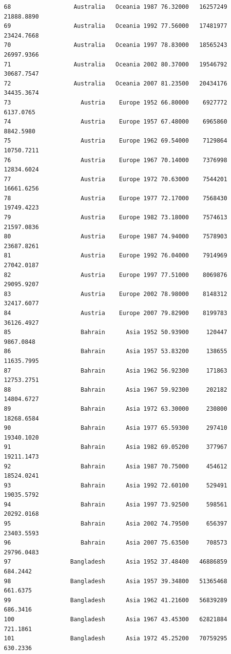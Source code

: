 \documentclass[
  letterpaper,
  DIV=11,
  numbers=noendperiod]{scrreprt}
\begin{document}
\begin{verbatim}
68                  Australia   Oceania 1987 76.32000   16257249  21888.8890
69                  Australia   Oceania 1992 77.56000   17481977  23424.7668
70                  Australia   Oceania 1997 78.83000   18565243  26997.9366
71                  Australia   Oceania 2002 80.37000   19546792  30687.7547
72                  Australia   Oceania 2007 81.23500   20434176  34435.3674
73                    Austria    Europe 1952 66.80000    6927772   6137.0765
74                    Austria    Europe 1957 67.48000    6965860   8842.5980
75                    Austria    Europe 1962 69.54000    7129864  10750.7211
76                    Austria    Europe 1967 70.14000    7376998  12834.6024
77                    Austria    Europe 1972 70.63000    7544201  16661.6256
78                    Austria    Europe 1977 72.17000    7568430  19749.4223
79                    Austria    Europe 1982 73.18000    7574613  21597.0836
80                    Austria    Europe 1987 74.94000    7578903  23687.8261
81                    Austria    Europe 1992 76.04000    7914969  27042.0187
82                    Austria    Europe 1997 77.51000    8069876  29095.9207
83                    Austria    Europe 2002 78.98000    8148312  32417.6077
84                    Austria    Europe 2007 79.82900    8199783  36126.4927
85                    Bahrain      Asia 1952 50.93900     120447   9867.0848
86                    Bahrain      Asia 1957 53.83200     138655  11635.7995
87                    Bahrain      Asia 1962 56.92300     171863  12753.2751
88                    Bahrain      Asia 1967 59.92300     202182  14804.6727
89                    Bahrain      Asia 1972 63.30000     230800  18268.6584
90                    Bahrain      Asia 1977 65.59300     297410  19340.1020
91                    Bahrain      Asia 1982 69.05200     377967  19211.1473
92                    Bahrain      Asia 1987 70.75000     454612  18524.0241
93                    Bahrain      Asia 1992 72.60100     529491  19035.5792
94                    Bahrain      Asia 1997 73.92500     598561  20292.0168
95                    Bahrain      Asia 2002 74.79500     656397  23403.5593
96                    Bahrain      Asia 2007 75.63500     708573  29796.0483
97                 Bangladesh      Asia 1952 37.48400   46886859    684.2442
98                 Bangladesh      Asia 1957 39.34800   51365468    661.6375
99                 Bangladesh      Asia 1962 41.21600   56839289    686.3416
100                Bangladesh      Asia 1967 43.45300   62821884    721.1861
101                Bangladesh      Asia 1972 45.25200   70759295    630.2336

\end{verbatim}
\end{document}

